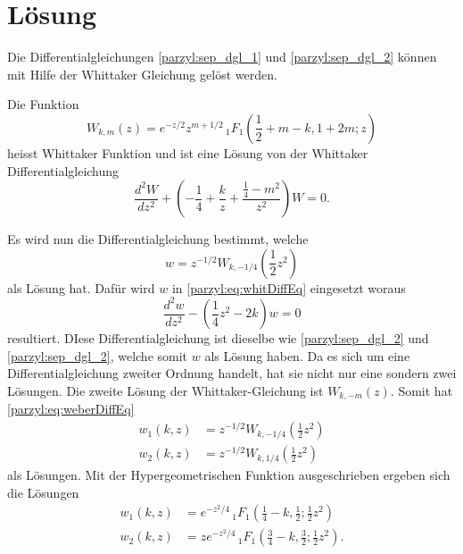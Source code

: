 %
%
%
\section{Lösung
\label{parzyl:section:teil1}}
Die Differentialgleichungen \eqref{parzyl:sep_dgl_1} und \eqref{parzyl:sep_dgl_2} können mit
Hilfe der Whittaker Gleichung gelöst werden.
\begin{definition}
    Die Funktion 
    \begin{equation*}
        W_{k,m}(z) = 
    e^{-z/2} z^{m+1/2} \,
    {}_{1} F_{1}
    (
        {\textstyle \frac{1}{2}} 
        + m - k, 1 + 2m; z)
    \end{equation*}
    heisst Whittaker Funktion und ist eine Lösung
    von der Whittaker Differentialgleichung
    \begin{equation}
        \frac{d^2W}{d z^2} +
        \left(-\frac{1}{4}  + \frac{k}{z} + \frac{\frac{1}{4} - m^2}{z^2} \right) W = 0.
        \label{parzyl:eq:whitDiffEq}
    \end{equation}
\end{definition}
Es wird nun die Differentialgleichung bestimmt, welche
\begin{equation}
    w = z^{-1/2} W_{k,-1/4} \left({\textstyle \frac{1}{2}} z^2\right)
\end{equation}
als Lösung hat.
Dafür wird $w$ in \eqref{parzyl:eq:whitDiffEq} eingesetzt woraus
\begin{equation}
    \frac{d^2 w}{dz^2} - \left(\frac{1}{4} z^2 - 2k\right) w = 0
\label{parzyl:eq:weberDiffEq}
\end{equation}
resultiert. DIese Differentialgleichung ist dieselbe wie 
\eqref{parzyl:sep_dgl_2} und \eqref{parzyl:sep_dgl_2}, welche somit
$w$ als Lösung haben.
Da es sich um eine Differentialgleichung zweiter Ordnung handelt, hat sie nicht nur
eine sondern zwei Lösungen.
Die zweite Lösung der Whittaker-Gleichung ist $W_{k,-m} (z)$.
Somit hat \eqref{parzyl:eq:weberDiffEq}
\begin{align}
    w_1(k, z) & = z^{-1/2} W_{k,-1/4} \left({\textstyle \frac{1}{2}} z^2\right)\\
    w_2(k, z) & = z^{-1/2} W_{k,1/4} \left({\textstyle \frac{1}{2}} z^2\right)
\end{align}
als Lösungen.
Mit der Hypergeometrischen Funktion ausgeschrieben ergeben sich die Lösungen
\begin{align}
	\label{parzyl:eq:solution_dgl}
    w_1(k,z) &= e^{-z^2/4} \,
    {}_{1} F_{1}
    (
        {\textstyle \frac{1}{4}} 
         - k, {\textstyle \frac{1}{2}} ; {\textstyle \frac{1}{2}}z^2) \\
    w_2(k,z) & = z e^{-z^2/4} \,
         {}_{1} F_{1}
         ({\textstyle \frac{3}{4}} 
              - k, {\textstyle \frac{3}{2}} ; {\textstyle \frac{1}{2}}z^2).
\end{align}
